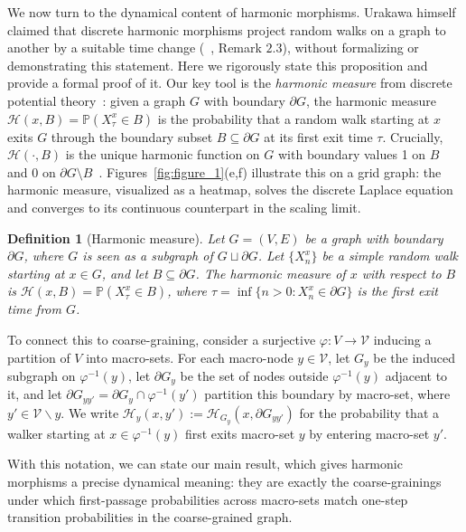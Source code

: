 \documentclass[twocolumn,superscriptaddress,tightenlines,aps,prx,floatfix]{revtex4-2}
\newtheorem{definition}{Definition}
\begin{document}
\begin{bibunit}
We now turn to the dynamical content of harmonic morphisms. 
Urakawa himself claimed that discrete harmonic morphisms project random walks on a graph to another by a suitable time change (~\cite{Urakawa_Harmonic_morphisms_2000}, Remark $2.3$), without formalizing or demonstrating this statement. 
Here we rigorously state this proposition and provide a formal proof of it.
Our key tool is the \emph{harmonic measure} from discrete potential theory~\cite{barahudcovaLatticeModels,Lawler1991}: given a graph $G$ with boundary $\partial G$, the harmonic measure $\mathcal{H}(x, B) = \mathbb{P}(X^x_\tau \in B)$ is the probability that a random walk starting at $x$ exits $G$ through the boundary subset $B \subseteq \partial G$ at its first exit time $\tau$. Crucially, $\mathcal{H}(\cdot, B)$ is the unique harmonic function on $G$ with boundary values 1 on $B$ and 0 on $\partial G \setminus B$~\cite{barahudcovaLatticeModels}. Figures~\ref{fig:figure_1}(e,f) illustrate this on a grid graph: the harmonic measure, visualized as a heatmap, solves the discrete Laplace equation and converges to its continuous counterpart in the scaling limit.

\begin{definition}[Harmonic measure]
\label{def:harmonic_measure}
Let $G=(V,E)$ be a graph with boundary $\partial G$, where $G$ is seen as a subgraph of $G \sqcup \partial G$. Let $\{X^x_n\}$ be a simple random walk starting at $x \in G$, and let $B \subseteq \partial G$. The \emph{harmonic measure} of $x$ with respect to $B$ is
$\mathcal{H}(x,B) = \mathbb{P}(X^x_\tau \in B)$,
where $\tau = \inf\{ n > 0 : X^x_n \in \partial G \}$ is the first exit time from $G$.
\end{definition}
To connect this to coarse-graining, consider a surjective $\varphi: V \rightarrow \mathcal{V}$ inducing a partition of $V$ into macro-sets. For each macro-node $y \in \mathcal{V}$, let $G_y$ be the induced subgraph on $\varphi^{-1}(y)$, let $\partial G_y$ be the set of nodes outside $\varphi^{-1}(y)$ adjacent to it, and let $\partial G_{yy'} = \partial G_y \cap \varphi^{-1}(y')$ partition this boundary by macro-set, where $y'\in\mathcal{V}\backslash y$. We write $\mathcal{H}_y(x, y') := \mathcal{H}_{G_y}(x, \partial G_{yy'})$ for the probability that a walker starting at $x \in \varphi^{-1}(y)$ first exits macro-set $y$ by entering macro-set $y'$.

With this notation, we can state our main result, which gives harmonic morphisms a precise dynamical meaning: they are exactly the coarse-grainings under which first-passage probabilities across macro-sets match one-step transition probabilities in the coarse-grained graph.


\end{bibunit}
\end{document}
